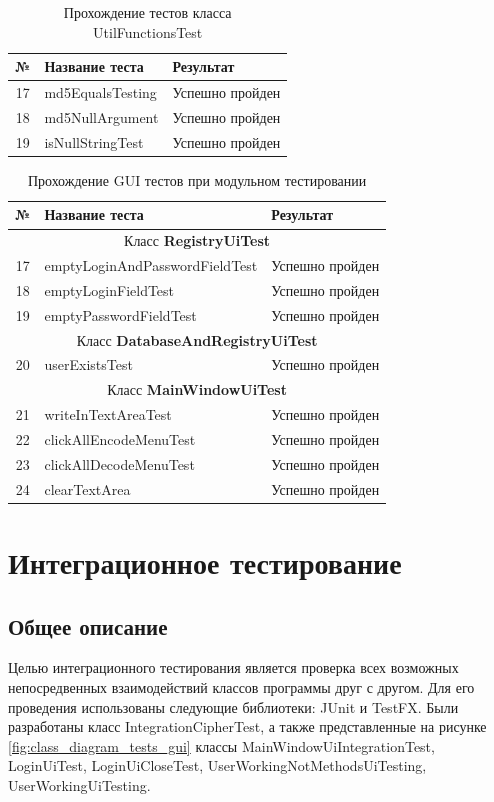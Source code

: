 \documentclass[a4paper,12pt]{article}
\begin{document}
\begin{table}[h]
	\caption{Прохождение тестов класса UtilFunctionsTest}
	\centering
	\begin{tabular}{|c|l|l|}
	\hline 
	№ &  Название теста & Результат \\ 
	\hline 
	17 &  md5EqualsTesting & Успешно пройден  \\
	\hline 
	18 &  md5NullArgument & Успешно пройден  \\
	\hline 
	19 & isNullStringTest & Успешно пройден  \\
	\hline 
\end{tabular} 
\label{table:unit_testing_UtilFunctionsTest} 
\end{table}

\begin{table}[pt!]
	\caption{Прохождение GUI тестов при модульном тестировании}
	\centering
	\begin{tabular}{|c|l|l|}
	\hline 
	№ &  Название теста & Результат \\ 
	\hline 
	\multicolumn{3}{|c|}{Класс \textbf{RegistryUiTest}}\\
	\hline
	17 &  emptyLoginAndPasswordFieldTest & Успешно пройден  \\
	\hline 
	18 &  emptyLoginFieldTest & Успешно пройден  \\
	\hline 
	19 & emptyPasswordFieldTest & Успешно пройден  \\
	\hline 
	\multicolumn{3}{|c|}{Класс \textbf{DatabaseAndRegistryUiTest}}\\
	\hline
	20 & userExistsTest & Успешно пройден  \\
	\hline 
	\multicolumn{3}{|c|}{Класс \textbf{MainWindowUiTest}}\\
	\hline
	21 & writeInTextAreaTest & Успешно пройден  \\
	\hline
	22 & clickAllEncodeMenuTest & Успешно пройден  \\
	\hline
	23 & clickAllDecodeMenuTest & Успешно пройден  \\
	\hline
	24 & clearTextArea & Успешно пройден  \\
	\hline
\end{tabular} 
\label{table:unit_testing_UtilFunctionsTest} 
\end{table}

\newpage \section{Интеграционное тестирование}
\subsection{Общее описание}
Целью интеграционного тестирования является проверка всех возможных непосредвенных взаимодействий классов программы друг с другом. 
Для его проведения использованы следующие библиотеки: JUnit и TestFX.
Были разработаны класс IntegrationCipherTest, а также представленные на рисунке \ref{fig:class_diagram_tests_gui} классы MainWindowUiIntegrationTest, LoginUiTest, LoginUiCloseTest, UserWorkingNotMethodsUiTesting, UserWorkingUiTesting.
\end{document}
